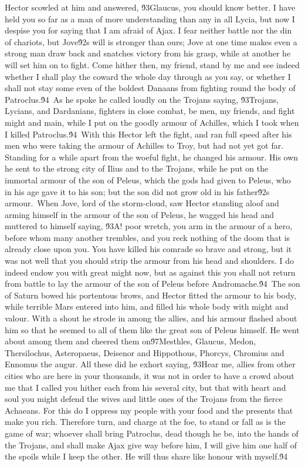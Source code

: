 {Hector scowled at him and answered, \'93Glaucus, you should know better. I have held you so far as a man of more understanding than any in all Lycia, but now I despise you for saying that I am afraid of Ajax. I fear neither battle nor the din of chariots, but Jove\'92s will is stronger than ours; Jove at one time makes even a strong man draw back and snatches victory from his grasp, while at another he will set him on to fight. Come hither then, my friend, stand by me and see indeed whether I shall play the coward the whole day through as you say, or whether I shall not stay some even of the boldest Danaans from fighting round the body of Patroclus.\'94\
As he spoke he called loudly on the Trojans saying, \'93Trojans, Lycians, and Dardanians, fighters in close combat, be men, my friends, and fight might and main, while I put on the goodly armour of Achilles, which I took when I killed Patroclus.\'94\
With this Hector left the fight, and ran full speed after his men who were taking the armour of Achilles to Troy, but had not yet got far. Standing for a while apart from the woeful fight, he changed his armour. His own he sent to the strong city of Ilius and to the Trojans, while he put on the immortal armour of the son of Peleus, which the gods had given to Peleus, who in his age gave it to his son; but the son did not grow old in his father\'92s armour.\
When Jove, lord of the storm-cloud, saw Hector standing aloof and arming himself in the armour of the son of Peleus, he wagged his head and muttered to himself saying, \'93A! poor wretch, you arm in the armour of a hero, before whom many another trembles, and you reck nothing of the doom that is already close upon you. You have killed his comrade so brave and strong, but it was not well that you should strip the armour from his head and shoulders. I do indeed endow you with great might now, but as against this you shall not return from battle to lay the armour of the son of Peleus before Andromache.\'94\
The son of Saturn bowed his portentous brows, and Hector fitted the armour to his body, while terrible Mars entered into him, and filled his whole body with might and valour. With a shout he strode in among the allies, and his armour flashed about him so that he seemed to all of them like the great son of Peleus himself. He went about among them and cheered them on\'97Mesthles, Glaucus, Medon, Thersilochus, Asteropaeus, Deisenor and Hippothous, Phorcys, Chromius and Ennomus the augur. All these did he exhort saying, \'93Hear me, allies from other cities who are here in your thousands, it was not in order to have a crowd about me that I called you hither each from his several city, but that with heart and soul you might defend the wives and little ones of the Trojans from the fierce Achaeans. For this do I oppress my people with your food and the presents that make you rich. Therefore turn, and charge at the foe, to stand or fall as is the game of war; whoever shall bring Patroclus, dead though he be, into the hands of the Trojans, and shall make Ajax give way before him, I will give him one half of the spoils while I keep the other. He will thus share like honour with myself.\'94\
}
